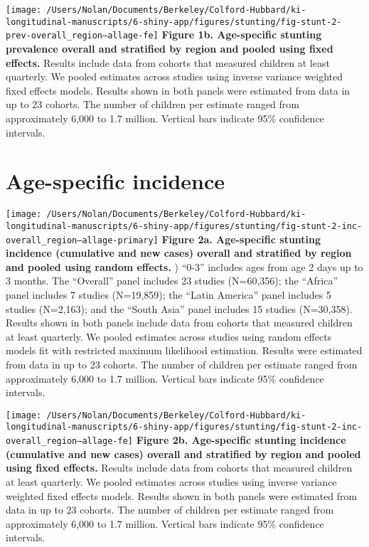 \documentclass[9pt,]{book}
\begin{document}
\texttt{[image: /Users/Nolan/Documents/Berkeley/Colford-Hubbard/ki-longitudinal-manuscripts/6-shiny-app/figures/stunting/fig-stunt-2-prev-overall\_region--allage-fe]}
\textbf{Figure 1b. Age-specific stunting prevalence overall and
stratified by region and pooled using fixed effects. } Results include
data from cohorts that measured children at least quarterly. We pooled
estimates across studies using inverse variance weighted fixed effects
models. Results shown in both panels were estimated from data in up to
23 cohorts. The number of children per estimate ranged from
approximately 6,000 to 1.7 million. Vertical bars indicate 95\%
confidence intervals.

\section{Age-specific incidence}\label{age-specific-incidence}

\texttt{[image: /Users/Nolan/Documents/Berkeley/Colford-Hubbard/ki-longitudinal-manuscripts/6-shiny-app/figures/stunting/fig-stunt-2-inc-overall\_region--allage-primary]}
\textbf{Figure 2a. Age-specific stunting incidence (cumulative and new
cases) overall and stratified by region and pooled using random
effects.} ) ``0-3'' includes ages from age 2 days up to 3 months. The
``Overall'' panel includes 23 studies (N=60,356); the ``Africa'' panel
includes 7 studies (N=19,859); the ``Latin America'' panel includes 5
studies (N=2,163); and the ``South Asia'' panel includes 15 studies
(N=30,358). Results shown in both panels include data from cohorts that
measured children at least quarterly. We pooled estimates across studies
using random effects models fit with restricted maximum likelihood
estimation. Results were estimated from data in up to 23 cohorts. The
number of children per estimate ranged from approximately 6,000 to 1.7
million. Vertical bars indicate 95\% confidence intervals.

\texttt{[image: /Users/Nolan/Documents/Berkeley/Colford-Hubbard/ki-longitudinal-manuscripts/6-shiny-app/figures/stunting/fig-stunt-2-inc-overall\_region--allage-fe]}
\textbf{Figure 2b. Age-specific stunting incidence (cumulative and new
cases) overall and stratified by region and pooled using fixed effects.}
Results include data from cohorts that measured children at least
quarterly. We pooled estimates across studies using inverse variance
weighted fixed effects models. Results shown in both panels were
estimated from data in up to 23 cohorts. The number of children per
estimate ranged from approximately 6,000 to 1.7 million. Vertical bars
indicate 95\% confidence intervals.
\end{document}
